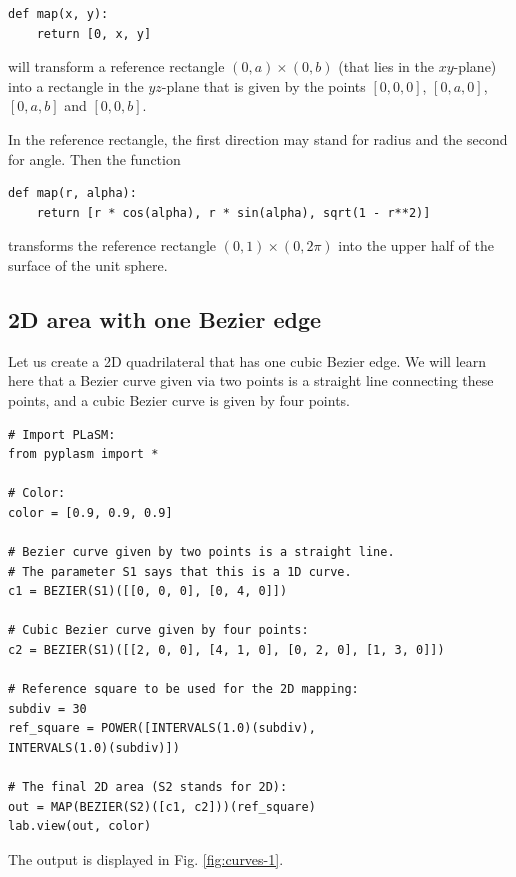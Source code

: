 \documentclass{article}
\begin{document}
\begin{verbatim}
def map(x, y):
    return [0, x, y]
\end{verbatim}
will transform a reference rectangle $(0, a)\times(0, b)$ (that lies in the $xy$-plane)
into a rectangle in the $yz$-plane that is given by the points $[0, 0, 0]$, $[0, a, 0]$,
$[0, a, b]$ and $[0, 0, b]$. 

In the reference rectangle, the first direction may
stand for radius and the second for angle. Then the function 

\begin{verbatim}
def map(r, alpha):
    return [r * cos(alpha), r * sin(alpha), sqrt(1 - r**2)]
\end{verbatim}
transforms the reference rectangle $(0, 1)\times (0, 2\pi)$ into 
the upper half of the surface of the unit sphere.

\subsection{2D area with one Bezier edge}

Let us create a 2D quadrilateral that has one cubic Bezier edge. We will learn here
that a Bezier curve given via two points is a straight line connecting 
these points, and a cubic Bezier curve is given by four points.

\begin{verbatim}
# Import PLaSM:
from pyplasm import *

# Color:
color = [0.9, 0.9, 0.9]
  
# Bezier curve given by two points is a straight line.
# The parameter S1 says that this is a 1D curve. 
c1 = BEZIER(S1)([[0, 0, 0], [0, 4, 0]])

# Cubic Bezier curve given by four points:
c2 = BEZIER(S1)([[2, 0, 0], [4, 1, 0], [0, 2, 0], [1, 3, 0]])

# Reference square to be used for the 2D mapping:
subdiv = 30
ref_square = POWER([INTERVALS(1.0)(subdiv),
INTERVALS(1.0)(subdiv)])

# The final 2D area (S2 stands for 2D):
out = MAP(BEZIER(S2)([c1, c2]))(ref_square)
lab.view(out, color)
\end{verbatim}
The output is displayed in Fig. \ref{fig:curves-1}.
\end{document}
